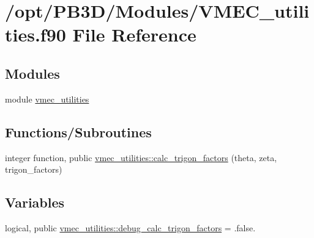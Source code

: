 \hypertarget{VMEC__utilities_8f90}{}\section{/opt/\+P\+B3\+D/\+Modules/\+V\+M\+E\+C\+\_\+utilities.f90 File Reference}
\label{VMEC__utilities_8f90}
\subsection*{Modules}
\begin{DoxyCompactItemize}
\item 
module \hyperlink{namespacevmec__utilities}{vmec\+\_\+utilities}
\end{DoxyCompactItemize}
\subsection*{Functions/\+Subroutines}
\begin{DoxyCompactItemize}
\item 
integer function, public \hyperlink{namespacevmec__utilities_ac699116fc25fdea3e28e488513d97c87}{vmec\+\_\+utilities\+::calc\+\_\+trigon\+\_\+factors} (theta, zeta, trigon\+\_\+factors)
\end{DoxyCompactItemize}
\subsection*{Variables}
\begin{DoxyCompactItemize}
\item 
logical, public \hyperlink{namespacevmec__utilities_abeb2bf5595170bdf2dd07a6f2bfa89ff}{vmec\+\_\+utilities\+::debug\+\_\+calc\+\_\+trigon\+\_\+factors} = .false.
\end{DoxyCompactItemize}
